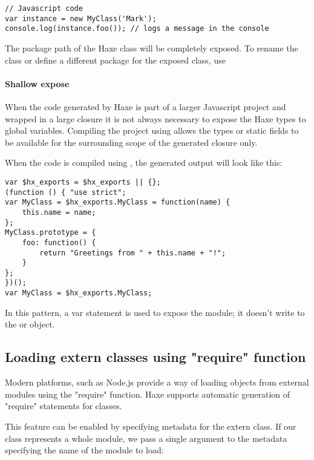 \begin{lstlisting}
// Javascript code
var instance = new MyClass('Mark');
console.log(instance.foo()); // logs a message in the console
\end{lstlisting}

The package path of the Haxe class will be completely exposed. To rename the class or define a different package for the exposed class, use 

\paragraph{Shallow expose}

When the code generated by Haxe is part of a larger Javascript project and wrapped in a large closure it is not always necessary to expose the Haxe types to global variables.
Compiling the project using  allows the types or static fields to be available for the surrounding scope of the generated closure only.

When the code is compiled using , the generated output will look like this:

\begin{lstlisting}
var $hx_exports = $hx_exports || {};
(function () { "use strict";
var MyClass = $hx_exports.MyClass = function(name) {
	this.name = name;
};
MyClass.prototype = {
	foo: function() {
		return "Greetings from " + this.name + "!";
	}
};
})();
var MyClass = $hx_exports.MyClass;
\end{lstlisting}

In this pattern, a var statement is used to expose the module; it doesn't write to the  or  object. 

\subsection{Loading extern classes using "require" function}
\label{target-javascript-require}

Modern  platforms, such as Node.js provide a way of loading objects
from external modules using the "require" function. Haxe supports automatic generation
of "require" statements for  classes.

This feature can be enabled by specifying  metadata for the extern class. If our  class represents a whole module, we pass a single argument to the  metadata specifying the name of the module to load:

